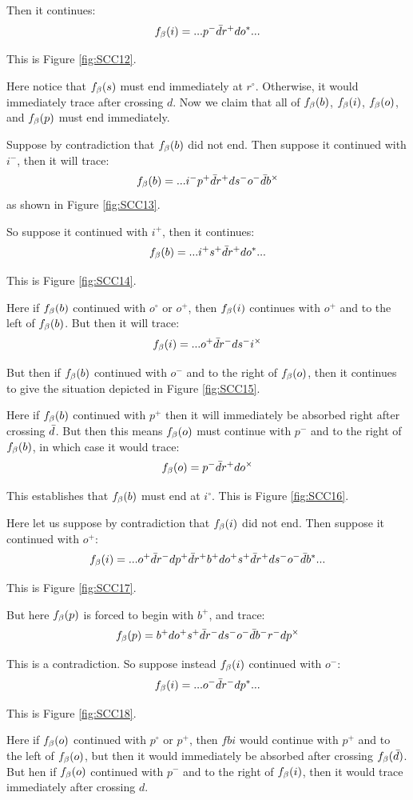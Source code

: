 Then it continues:
\[
f_\beta(i) = ...p^- \bar{d} r^+ d o^*...
\]

This is Figure \ref{fig:SCC12}.

Here notice that $f_\beta(s)$ must end immediately at $r^\circ$. Otherwise, it would immediately trace after crossing $d$. Now we claim that all of $f_\beta(b)$, $f_\beta(i)$, $f_\beta(o)$, and $f_\beta(p)$ must end immediately.

Suppose by contradiction that $f_\beta(b)$ did not end. Then suppose it continued with $i^-$, then it will trace:
\[
f_\beta(b) =...i^- p^+ \bar{d} r^+ d s^- o^- \bar{d} b^\times
\]
as shown in Figure \ref{fig:SCC13}.

So suppose it continued with $i^+$, then it continues:
\[
f_\beta(b) = ...i^+ s^+ \bar{d} r^+ d o^*...
\]

This is Figure \ref{fig:SCC14}.

Here if $f_\beta(b)$ continued with $o^\circ$ or $o^+$, then $f_\beta(i)$ continues with $o^+$ and to the left of $f_\beta(b)$. But then it will trace:
\[
f_\beta(i) = ...o^+ \bar{d} r^- d s^- i^\times
\]

But then if $f_\beta(b)$ continued with $o^-$ and to the right of $f_\beta(o)$, then it continues to give the situation depicted in Figure \ref{fig:SCC15}.

Here if $f_\beta(b)$ continued with $p^+$ then it will immediately be absorbed right after crossing $\bar{d}$. But then this means $f_\beta(o)$ must continue with $p^-$ and to the right of $f_\beta(b)$, in which case it would trace:
\[
f_\beta(o) = p^- \bar{d} r^+ d o^\times
\]

This establishes that $f_\beta(b)$ must end at $i^\circ$. This is Figure \ref{fig:SCC16}.

Here let us suppose by contradiction that $f_\beta(i)$ did not end. Then suppose it continued with $o^+$:
\[
f_\beta(i) = ...o^+ \bar{d} r^- d p^+ \bar{d} r^+ b^+ d o^+ s^+ \bar{d} r^+ d s^- o^- \bar{d} b^*...
\]

This is Figure \ref{fig:SCC17}.

But here $f_\beta(p)$ is forced to begin with $b^+$, and trace:
\[
f_\beta(p) = b^+ d o^+ s^+ \bar{d} r^- d s^- o^- \bar{d} b^- r^- d p^\times
\]

This is a contradiction. So suppose instead $f_\beta(i)$ continued with $o^-$:
\[
f_\beta(i) =...o^- \bar{d} r^- d p^*...
\]

This is Figure \ref{fig:SCC18}.

Here if $f_\beta(o)$ continued with $p^\circ$ or $p^+$, then $fbi$ would continue with $p^+$ and to the left of $f_\beta(o)$, but then it would immediately be absorbed after crossing $f_\beta(\bar{d})$. But hen if $f_\beta(o)$ continued with $p^-$ and to the right of $f_\beta(i)$, then it would trace immediately after crossing $d$.

